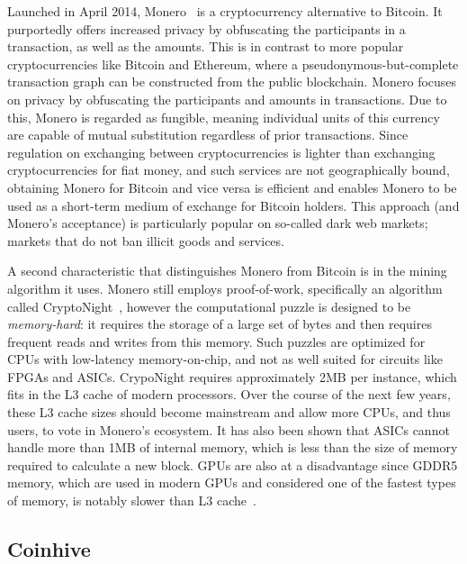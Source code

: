 Launched in April 2014, Monero~\cite{monero} is a cryptocurrency alternative to Bitcoin. It purportedly offers increased privacy by obfuscating the participants in a transaction, as well as the amounts. This is in contrast to more popular cryptocurrencies like Bitcoin and Ethereum, where a pseudonymous-but-complete transaction graph can be constructed from the public blockchain.  Monero focuses on privacy by obfuscating the participants and amounts in transactions. Due to this, Monero is regarded as fungible, meaning individual units of this currency are capable of mutual substitution regardless of prior transactions.
Since regulation on exchanging between cryptocurrencies is lighter than exchanging cryptocurrencies for fiat money, and such services are not geographically bound, obtaining Monero for Bitcoin and vice versa is efficient and enables Monero to be used as a short-term medium of exchange for Bitcoin holders. This approach (and Monero's acceptance) is particularly popular on so-called dark web markets; markets that do not ban illicit goods and services.


A second characteristic that distinguishes Monero from Bitcoin is in the mining algorithm it uses. Monero still employs proof-of-work, specifically an algorithm called CryptoNight~\cite{cryptoknight}, however the computational puzzle is designed to be \textit{memory-hard}: it requires the storage of a large set of bytes and then requires frequent reads and writes from this memory. Such puzzles are optimized for CPUs with low-latency memory-on-chip, and not as well suited for circuits like FPGAs and ASICs. CrypoNight requires approximately 2MB per instance, which fits in the L3 cache of modern processors. Over the course of the next few years, these L3 cache sizes should become mainstream and allow more CPUs, and thus users, to vote in Monero's ecosystem. It has also been shown that ASICs cannot handle more than 1MB of internal memory, which is less than the size of memory required to calculate a new block. GPUs are also at a disadvantage since GDDR5 memory, which are used in modern GPUs and considered one of the fastest types of memory, is notably slower than L3 cache~\cite{van2013cryptonote}.  


\subsection{Coinhive}





